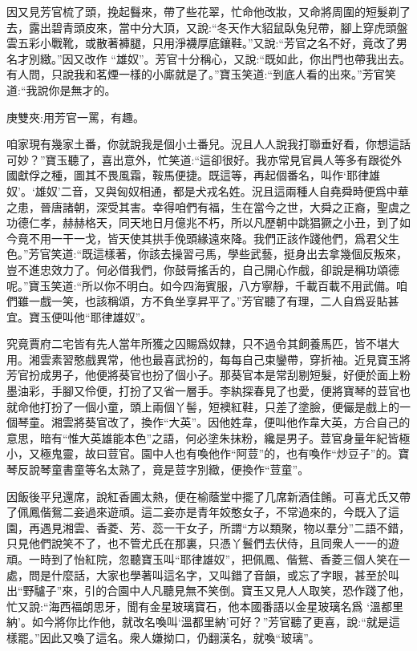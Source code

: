 \begin{parag}
    因又見芳官梳了頭，挽起䰖來，帶了些花翠，忙命他改妝，又命將周圍的短髮剃了去，露出碧青頭皮來，當中分大頂，又說:“冬天作大貂鼠臥兔兒帶，腳上穿虎頭盤雲五彩小戰靴，或散著褲腿，只用淨襪厚底鑲鞋。”又說:“芳官之名不好，竟改了男名才別緻。”因又改作 “雄奴”。芳官十分稱心，又說:“既如此，你出門也帶我出去。有人問，只說我和茗煙一樣的小廝就是了。”寶玉笑道:“到底人看的出來。”芳官笑道:“我說你是無才的。\begin{note}庚雙夾:用芳官一罵，有趣。\end{note}咱家現有幾家土番，你就說我是個小土番兒。況且人人說我打聯垂好看，你想這話可妙？”寶玉聽了，喜出意外，忙笑道:“這卻很好。我亦常見官員人等多有跟從外國獻俘之種，圖其不畏風霜，鞍馬便捷。既這等，再起個番名，叫作‘耶律雄奴’。‘雄奴’二音，又與匈奴相通，都是犬戎名姓。況且這兩種人自堯舜時便爲中華之患，晉唐諸朝，深受其害。幸得咱們有福，生在當今之世，大舜之正裔，聖虞之功德仁孝，赫赫格天，同天地日月億兆不朽，所以凡歷朝中跳猖獗之小丑，到了如今竟不用一干一戈，皆天使其拱手俛頭緣遠來降。我們正該作踐他們，爲君父生色。”芳官笑道:“既這樣著，你該去操習弓馬，學些武藝，挺身出去拿幾個反叛來，豈不進忠效力了。何必借我們，你鼓脣搖舌的，自己開心作戲，卻說是稱功頌德呢。”寶玉笑道:“所以你不明白。如今四海賓服，八方寧靜，千載百載不用武備。咱們雖一戲一笑，也該稱頌，方不負坐享昇平了。”芳官聽了有理，二人自爲妥貼甚宜。寶玉便叫他“耶律雄奴”。
\end{parag}


\begin{parag}
    究竟賈府二宅皆有先人當年所獲之囚賜爲奴隸，只不過令其飼養馬匹，皆不堪大用。湘雲素習憨戲異常，他也最喜武扮的，每每自己束鑾帶，穿折袖。近見寶玉將芳官扮成男子，他便將葵官也扮了個小子。那葵官本是常刮剔短髮，好便於面上粉墨油彩，手腳又伶便，打扮了又省一層手。李紈探春見了也愛，便將寶琴的荳官也就命他打扮了一個小童，頭上兩個丫髻，短襖紅鞋，只差了塗臉，便儼是戲上的一個琴童。湘雲將葵官改了，換作“大英”。因他姓韋，便叫他作韋大英，方合自己的意思，暗有“惟大英雄能本色”之語，何必塗朱抹粉，纔是男子。荳官身量年紀皆極小，又極鬼靈，故曰荳官。園中人也有喚他作“阿荳”的，也有喚作“炒豆子”的。寶琴反說琴童書童等名太熟了，竟是荳字別緻，便換作“荳童”。
\end{parag}


\begin{parag}
    因飯後平兒還席，說紅香圃太熱，便在榆蔭堂中擺了几席新酒佳餚。可喜尤氏又帶了佩鳳偕鴛二妾過來遊頑。這二妾亦是青年姣憨女子，不常過來的，今既入了這園，再遇見湘雲、香菱、芳、蕊一干女子，所謂“方以類聚，物以羣分”二語不錯，只見他們說笑不了，也不管尤氏在那裏，只憑丫鬟們去伏侍，且同衆人一一的遊頑。一時到了怡紅院，忽聽寶玉叫“耶律雄奴”，把佩鳳、偕鴛、香菱三個人笑在一處，問是什麼話，大家也學著叫這名字，又叫錯了音韻，或忘了字眼，甚至於叫出“野驢子”來，引的合園中人凡聽見無不笑倒。寶玉又見人人取笑，恐作踐了他，忙又說:“海西福朗思牙，聞有金星玻璃寶石，他本國番語以金星玻璃名爲 ‘溫都里納’。如今將你比作他，就改名喚叫‘溫都里納’可好？”芳官聽了更喜，說:“就是這樣罷。”因此又喚了這名。衆人嫌拗口，仍翻漢名，就喚“玻璃”。
\end{parag}


